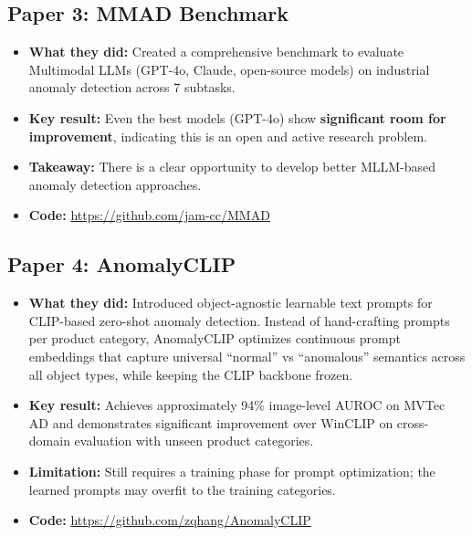 \documentclass[12pt, a4paper]{article}
\begin{document}
\subsection{Paper 3: MMAD Benchmark \cite{jiang2025mmad}}
\begin{itemize}[leftmargin=*]
    \item \textbf{What they did:} Created a comprehensive benchmark to evaluate Multimodal LLMs (GPT-4o, Claude, open-source models) on industrial anomaly detection across 7 subtasks.
    \item \textbf{Key result:} Even the best models (GPT-4o) show \textbf{significant room for improvement}, indicating this is an open and active research problem.
    \item \textbf{Takeaway:} There is a clear opportunity to develop better MLLM-based anomaly detection approaches.
    \item \textbf{Code:} \url{https://github.com/jam-cc/MMAD}
\end{itemize}

\subsection{Paper 4: AnomalyCLIP \cite{zhou2024anomalyclip}}
\begin{itemize}[leftmargin=*]
    \item \textbf{What they did:} Introduced object-agnostic learnable text prompts for CLIP-based zero-shot anomaly detection. Instead of hand-crafting prompts per product category, AnomalyCLIP optimizes continuous prompt embeddings that capture universal ``normal'' vs ``anomalous'' semantics across all object types, while keeping the CLIP backbone frozen.
    \item \textbf{Key result:} Achieves approximately 94\% image-level AUROC on MVTec AD and demonstrates significant improvement over WinCLIP on cross-domain evaluation with unseen product categories.
    \item \textbf{Limitation:} Still requires a training phase for prompt optimization; the learned prompts may overfit to the training categories.
    \item \textbf{Code:} \url{https://github.com/zqhang/AnomalyCLIP}
\end{itemize}
\end{document}
